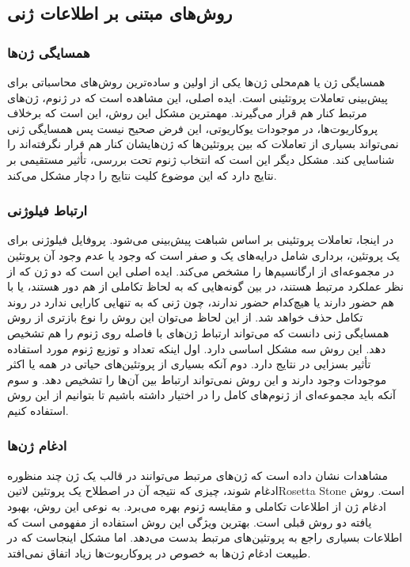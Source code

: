 \subsection{روش‌های مبتنی بر اطلاعات ژنی}
\subsubsection{همسایگی ژن‌ها}
همسایگی ژن یا هم‌محلی ژن‌ها یکی از اولین و ساده‌ترین روش‌های محاسباتی برای پیش‌بینی تعاملات پروتئینی است. ایده اصلی، این مشاهده است که در ژنوم، ژن‌های مرتبط کنار هم قرار می‌گیرند. مهمترین مشکل این روش، این است که برخلاف پروکاریوت‌ها، در موجودات یوکاریوتی، این فرض صحیح نیست پس همسایگی ژنی نمی‌تواند بسیاری از تعاملات که بین پروتئین‌ها که ژن‌هایشان کنار هم قرار نگرفته‌اند را شناسایی کند. مشکل دیگر این است که انتخاب ژنوم تحت بررسی، تأثیر مستقیمی بر نتایج دارد که این موضوع کلیت نتایج را دچار مشکل می‌کند.

\subsubsection{ارتباط فیلوژنی}
در اینجا، تعاملات پروتئینی بر اساس شباهت  پیش‌بینی می‌شود. پروفایل فیلوژنی برای یک پروتئین، برداری شامل درایه‌های یک و صفر است که وجود یا عدم وجود آن پروتئین در مجموعه‌ای از ارگانسیم‌ها را مشخص می‌کند. ایده اصلی این است که دو ژن که از نظر عملکرد مرتبط هستند، در بین گونه‌هایی که به لحاظ تکاملی از هم دور هستند، یا با هم حضور دارند یا هیچ‌کدام حضور ندارند، چون ژنی که به تنهایی کارایی ندارد در روند تکامل حذف خواهد شد. از این لحاظ می‌توان این روش را نوع  بازتری از روش همسایگی ژنی دانست که می‌تواند ارتباط ژن‌های با فاصله روی ژنوم را هم تشخیص دهد. این روش سه مشکل اساسی دارد. اول اینکه تعداد و توزیع ژنوم مورد استفاده تأثیر بسزایی در نتایج دارد. دوم آنکه بسیاری از پروتئین‌های حیاتی در همه یا اکثر موجودات وجود دارند و این روش نمی‌تواند ارتباط بین آن‌ها را تشخیص دهد. و سوم آنکه باید مجموعه‌ای از ژنوم‌های کامل را در اختیار داشته باشیم تا بتوانیم از این روش استفاده کنیم.

\subsubsection{ادغام ژن‌ها}
مشاهدات نشان داده است که ژن‌های مرتبط می‌توانند در قالب یک ژن چند منظوره ادغام شوند، چیزی که نتیجه آن در اصطلاح یک پروتئین ‌لاتین{Rosetta Stone} است. روش ادغام ژن از اطلاعات تکاملی و مقایسه ژنوم بهره می‌برد. به نوعی این روش، بهبود یافته دو روش قبلی است. بهترین ویژگی این روش استفاده از مفهومی است که اطلاعات بسیاری راجع به پروتئین‌های مرتبط بدست می‌دهد. اما مشکل اینجاست که در طبیعت ادغام ژن‌ها به خصوص در پروکاریوت‌ها زیاد اتفاق نمی‌افتد.

